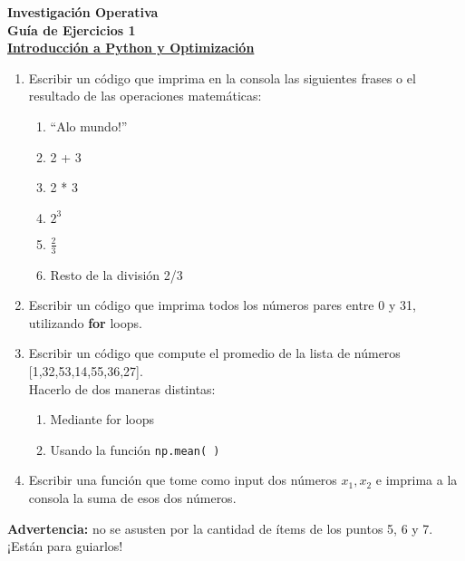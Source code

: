 \documentclass[12pt]{article}
\begin{document}
\begin{center}
    \textbf{\Large Investigación Operativa}\\[1ex]
    \vspace{0.5em}
    \textbf{\large Guía de Ejercicios 1}\\[0.5ex]
    \vspace{0.5em}
    \underline{\textbf{\large Introducción a Python y Optimización}}
\end{center}

\vspace{0.5em}

\begin{enumerate}
    \item Escribir un código que imprima en la consola las siguientes frases o el resultado de las operaciones matemáticas:
    \begin{enumerate}[label=\alph*)]
        \item “Alo mundo!”
        \item 2 + 3
        \item 2 * 3
        \item $2^3$
        \item $\frac{2}{3}$
        \item Resto de la división 2/3
    \end{enumerate}
    
    \item Escribir un código que imprima todos los números pares entre 0 y 31, utilizando \textbf{for} loops.
    
    \item Escribir un código que compute el promedio de la lista de números [1,32,53,14,55,36,27].\\
    Hacerlo de dos maneras distintas:
    \begin{enumerate}[label=\alph*)]
        \item Mediante for loops
        \item Usando la función \texttt{np.mean( )}
    \end{enumerate}
    
    \item Escribir una función que tome como input dos números $x_1,x_2$ e imprima a la consola la suma de esos dos números.
    
    \end{enumerate}
    \bigskip
    \noindent \textbf{Advertencia:} no se asusten por la cantidad de ítems de los puntos 5, 6 y 7. ¡Están para guiarlos!
    
\end{document}
